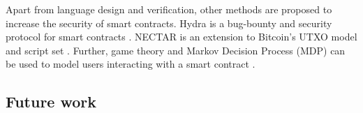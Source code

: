 Apart from language design and verification, other methods are proposed to increase the security of smart contracts. Hydra is a bug-bounty and security protocol for smart contracts \cite{Breidenbach2018}. 
NECTAR is an extension to Bitcoin's UTXO model and script set \cite{Covaci2018}. 
Further, game theory and Markov Decision Process (MDP) can be used to model users interacting with a smart contract \cite{Bigi2015}. 

\subsection{Future work}





